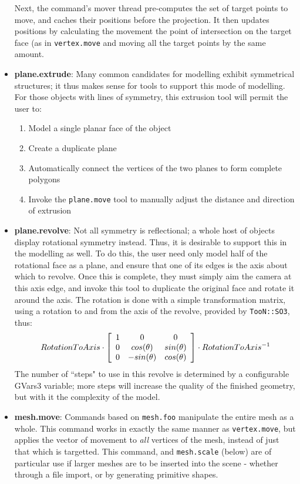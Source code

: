 \documentclass[a4paper,10pt]{article}
\begin{document}
\begin{itemize}
{Next, the command's mover thread pre-computes the set of target points to move, and caches their positions before the projection. It then updates positions by calculating the movement the point of intersection on the target face (as in \texttt{vertex.move} and moving all the target points by the same amount.}
\item{\textbf{plane.extrude}: Many common candidates for modelling exhibit symmetrical structures; it thus makes sense for tools to support this mode of modelling. For those objects with lines of symmetry, this extrusion tool will permit the user to:

\begin{enumerate}
 \item{Model a single planar face of the object}
 \item{Create a duplicate plane}
 \item{Automatically connect the vertices of the two planes to form complete polygons}
 \item{Invoke the \texttt{plane.move} tool to manually adjust the distance and direction of extrusion}
\end{enumerate}
}
\item{\textbf{plane.revolve}: Not all symmetry is reflectional; a whole host of objects display rotational symmetry instead. Thus, it is desirable to support this in the modelling as well. To do this, the user need only model half of the rotational face as a plane, and ensure that one of its edges is the axis about which to revolve. Once this is complete, they must simply aim the camera at this axis edge, and invoke this tool to duplicate the original face and rotate it around the axis. The rotation is done with a simple transformation matrix, using a rotation to and from the axis of the revolve, provided by \texttt{TooN::SO3}, thus:
\begin{eqnarray*}
 RotationToAxis \cdot  \left[ 
  \begin{array}{c c c}
    1 & 0 & 0 \\ 
    0 & cos( \theta ) & sin( \theta ) \\ 
    0 & -sin( \theta ) & cos( \theta ) 
  \end{array}\right] \cdot RotationToAxis^{-1}
\end{eqnarray*}
The number of ``steps" to use in this revolve is determined by a configurable GVars3 variable; more steps will increase the quality of the finished geometry, but with it the complexity of the model.}
\item{\textbf{mesh.move}: Commands based on \texttt{mesh.foo} manipulate the entire mesh as a whole. This command works in exactly the same manner as \texttt{vertex.move}, but applies the vector of movement to \textit{all} vertices of the mesh, instead of just that which is targetted. This command, and \texttt{mesh.scale} (below) are of particular use if larger meshes are to be inserted into the scene - whether through a file import, or by generating primitive shapes.}

\end{itemize}
\end{document}
